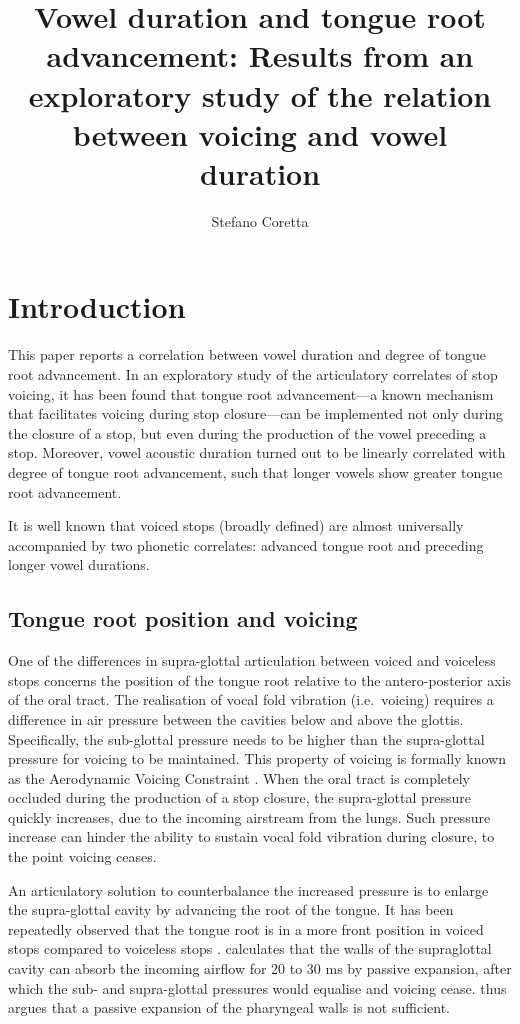 \documentclass[12pt,]{article}
\title{Vowel duration and tongue root advancement: Results from an exploratory
study of the relation between voicing and vowel duration}
\author{Stefano Coretta}
\date{}
\begin{document}
\maketitle

\section{Introduction}\label{introduction}

This paper reports a correlation between vowel duration and degree of
tongue root advancement. In an exploratory study of the articulatory
correlates of stop voicing, it has been found that tongue root
advancement---a known mechanism that facilitates voicing during stop
closure---can be implemented not only during the closure of a stop, but
even during the production of the vowel preceding a stop. Moreover,
vowel acoustic duration turned out to be linearly correlated with degree
of tongue root advancement, such that longer vowels show greater tongue
root advancement.

It is well known that voiced stops (broadly defined) are almost
universally accompanied by two phonetic correlates: advanced tongue root
and preceding longer vowel durations.

\subsection{Tongue root position and
voicing}\label{tongue-root-position-and-voicing}

One of the differences in supra-glottal articulation between voiced and
voiceless stops concerns the position of the tongue root relative to the
antero-posterior axis of the oral tract. The realisation of vocal fold
vibration (i.e.~voicing) requires a difference in air pressure between
the cavities below and above the glottis. Specifically, the sub-glottal
pressure needs to be higher than the supra-glottal pressure for voicing
to be maintained. This property of voicing is formally known as the
Aerodynamic Voicing Constraint \citep{ohala2011}. When the oral tract is
completely occluded during the production of a stop closure, the
supra-glottal pressure quickly increases, due to the incoming airstream
from the lungs. Such pressure increase can hinder the ability to sustain
vocal fold vibration during closure, to the point voicing ceases.

An articulatory solution to counterbalance the increased pressure is to
enlarge the supra-glottal cavity by advancing the root of the tongue. It
has been repeatedly observed that the tongue root is in a more front
position in voiced stops compared to voiceless stops
\citep{kent1969, perkell1969, westbury1983}. \citet{rothenberg1967}
calculates that the walls of the supraglottal cavity can absorb the
incoming airflow for 20 to 30 ms by passive expansion, after which the
sub- and supra-glottal pressures would equalise and voicing cease.
\citet{rothenberg1967} thus argues that a passive expansion of the
pharyngeal walls is not sufficient.
\end{document}
